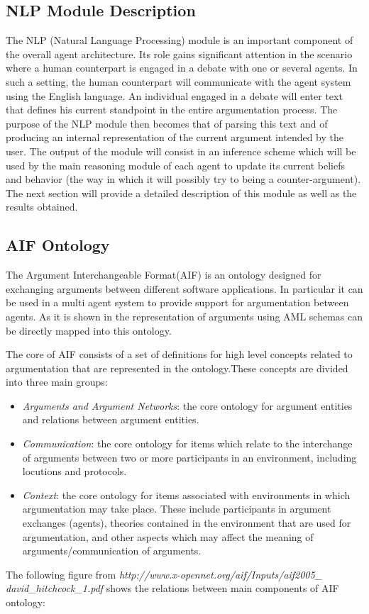 \subsection{NLP Module Description}

The NLP (Natural Language Processing) module is an important component of the overall agent architecture. Its role gains significant attention in the scenario where a human counterpart is engaged in a debate with one or several agents.
In such a setting, the human counterpart will communicate with the agent system using the English language. An individual engaged in a debate will enter text that defines his current standpoint in the entire argumentation process.
The purpose of the NLP module then becomes that of parsing this text and of producing an internal representation of the current argument intended by the user. The output of the module will consist in an inference scheme which will be used by the main reasoning module of each agent to update its current beliefs and behavior (the way in which it will possibly try to being a counter-argument). The next section will provide a detailed description of this module as well as the results obtained.

\subsection{AIF Ontology}

The Argument Interchangeable Format(AIF)\cite{aif} is an ontology designed for exchanging arguments between different software applications. In particular it can be used in a multi agent system to provide support for argumentation between agents. As it is shown in \cite{aif} the representation of arguments using AML\cite{araucaria}\cite{reed} schemas can be directly mapped into this ontology.
\par
The core of AIF consists of a set of definitions for high level concepts related to argumentation that are represented in the ontology.These concepts are divided into three main groups:
\begin{itemize}
\item \textit{Arguments and Argument Networks}: the core ontology for argument entities and relations between argument entities.
\item \textit{Communication}: the core ontology for items which relate to the interchange of arguments between two or more participants in an environment, including locutions and protocols.
\item \textit{Context}: the core ontology for items associated with environments in which argumentation may take place. These include participants in argument exchanges (agents), theories contained in the environment that are used for argumentation, and other aspects which may affect the meaning of arguments/communication of arguments.
\end{itemize}
The following figure from \textit{http://www.x-opennet.org/aif/Inputs/aif2005\_}
\newline
 \textit{david\_hitchcock\_1.pdf} shows the relations between main components of AIF ontology:

